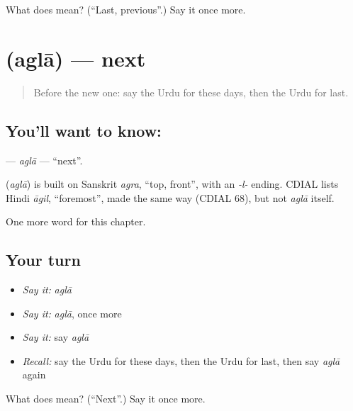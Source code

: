 \begin{tcolorbox}[breakable,colback=teal!4,colframe=teal!35!black,title={Before you move on}]
What does  mean? (\textquotedblleft{}Last, previous\textquotedblright{}.) Say it once more.
\end{tcolorbox}
\section[\texorpdfstring{\ur{اگلا} (aglā)}{اگلا (aglā)}]{ (aglā) — next}

\label{lesson:UR-C95-agla}



\begin{quote}
Before the new one: say the Urdu for these days, then the Urdu for last.
\end{quote}

\subsection*{You'll want to know: }
\textbf{} — \emph{aglā} — \textquotedblleft{}next\textquotedblright{}.

\begin{cousinweb}
\textbf{} (\emph{aglā}) is built on Sanskrit \emph{agra}, \textquotedblleft{}top, front\textquotedblright{}, with an \emph{-l-} ending. CDIAL lists Hindi \emph{āgil}, \textquotedblleft{}foremost\textquotedblright{}, made the same way (CDIAL 68), but not \emph{aglā} itself.
\end{cousinweb}

\begin{grammarlens}[title={What you've built}]
One more word for this chapter.
\end{grammarlens}

\subsection*{Your turn}
\begin{itemize}
\raggedright
  \item \emph{Say it:} \emph{aglā}
  \item \emph{Say it:} \emph{aglā}, once more
  \item \emph{Say it:} say \emph{aglā}
  \item \emph{Recall:} say the Urdu for these days, then the Urdu for last, then say \emph{aglā} again
\end{itemize}

\begin{tcolorbox}[breakable,colback=teal!4,colframe=teal!35!black,title={Before you move on}]
What does  mean? (\textquotedblleft{}Next\textquotedblright{}.) Say it once more.
\end{tcolorbox}
